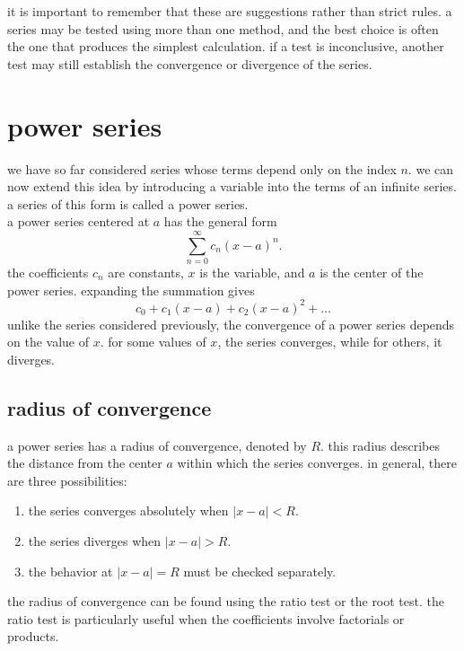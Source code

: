\documentclass{article}
\begin{document}
it is important to remember that these are suggestions rather than strict rules. a series may be tested using more than one method, and the best choice is often the one that produces the simplest calculation. if a test is inconclusive, another test may still establish the convergence or divergence of the series.\\

\newpage

\section{power series}

we have so far considered series whose terms depend only on the index $n$. we can now extend this idea by introducing a variable into the terms of an infinite series. a series of this form is called a power series.\\

a power series centered at $a$ has the general form
\[
\boxed{
\sum_{n=0}^{\infty}c_n(x-a)^n.
}
\]
the coefficients $c_n$ are constants, $x$ is the variable, and $a$ is the center of the power series. expanding the summation gives
\[
c_0+c_1(x-a)+c_2(x-a)^2+\ldots
\]
unlike the series considered previously, the convergence of a power series depends on the value of $x$. for some values of $x$, the series converges, while for others, it diverges.\\

\subsection{radius of convergence}

a power series has a radius of convergence, denoted by $R$. this radius describes the distance from the center $a$ within which the series converges. in general, there are three possibilities:

\begin{enumerate}
    \item the series converges absolutely when $|x-a|<R$.
    \item the series diverges when $|x-a|>R$.
    \item the behavior at $|x-a|=R$ must be checked separately.
\end{enumerate}

the radius of convergence can be found using the ratio test or the root test. the ratio test is particularly useful when the coefficients involve factorials or products.\\
\end{document}
